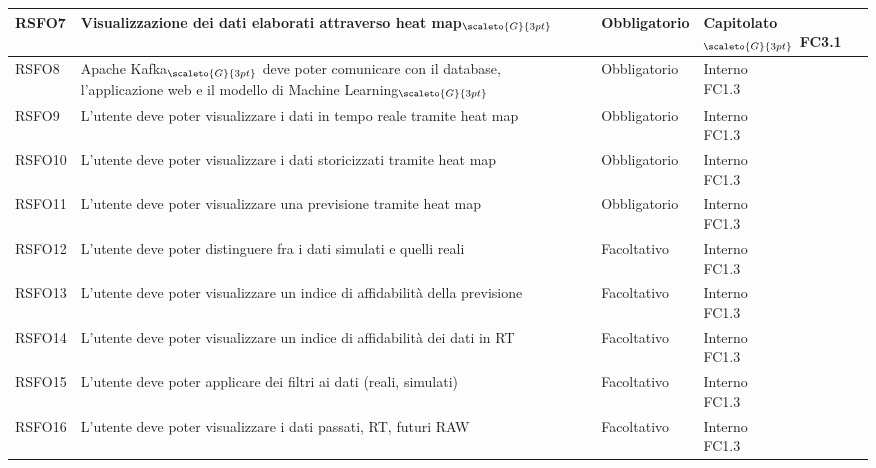 {\begin{center}
\begin{longtable}{|p{3cm}|p{4cm}|p{4cm}|p{4cm}|}
			\hline
			\centering RSFO7 & Visualizzazione dei dati elaborati attraverso heat map$_{\scaleto{G}{3pt}}$ &\centering  Obbligatorio & \makecell[tc]{Capitolato$_{\scaleto{G}{3pt}}$ \\ FC3.1}  \\
			\hline
			\centering RSFO8 & Apache Kafka$_{\scaleto{G}{3pt}}$ deve poter comunicare con il database, l'applicazione web e il modello di Machine Learning$_{\scaleto{G}{3pt}}$  &\centering  Obbligatorio &  \makecell[tc]{Interno \\ FC1.3} 	\\
			\hline
			\centering RSFO9 & L'utente deve poter visualizzare i dati in tempo reale tramite heat map  &\centering  Obbligatorio &  \makecell[tc]{Interno \\ FC1.3} 	\\
			\hline
			\centering RSFO10 & L'utente deve poter visualizzare i dati storicizzati tramite heat map  &\centering  Obbligatorio &  \makecell[tc]{Interno \\ FC1.3} 	\\
			\hline
			\centering RSFO11 & L'utente deve poter visualizzare una previsione tramite heat map  &\centering  Obbligatorio &  \makecell[tc]{Interno \\ FC1.3} 	\\
			\hline
			\centering RSFO12 & L'utente deve poter distinguere fra i dati simulati e quelli reali  &\centering  Facoltativo &  \makecell[tc]{Interno \\ FC1.3} 	\\
			\hline
			\centering RSFO13 & L'utente deve poter visualizzare un indice di affidabilità della previsione  &\centering  Facoltativo &  \makecell[tc]{Interno \\ FC1.3} 	\\
			\hline
			\centering RSFO14 & L'utente deve poter visualizzare un indice di affidabilità dei dati in RT  &\centering  Facoltativo &  \makecell[tc]{Interno \\ FC1.3} 	\\
			\hline
			\centering RSFO15 & L'utente deve poter applicare dei filtri ai dati (reali, simulati)  &\centering  Facoltativo &  \makecell[tc]{Interno \\ FC1.3} 	\\
			\hline
			\centering RSFO16 & L'utente deve poter visualizzare i dati passati, RT, futuri RAW  &\centering  Facoltativo &  \makecell[tc]{Interno \\ FC1.3} 	\\
			\hline


\end{longtable}
\end{center}}
